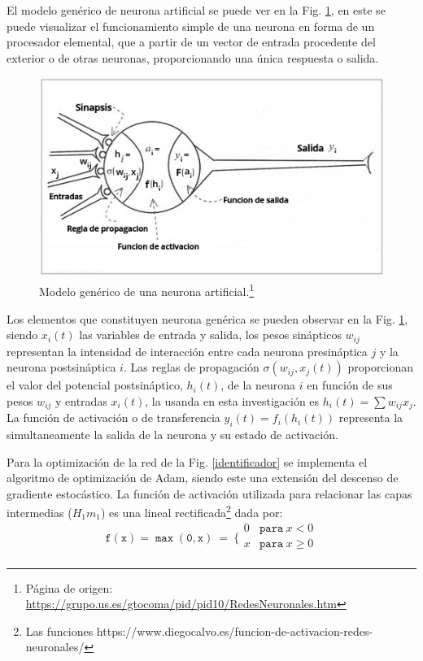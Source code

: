 El modelo genérico de neurona artificial se puede ver en la Fig. \ref{generico}, en este se puede visualizar el funcionamiento simple de una neurona en forma de un procesador elemental, que a partir de un vector de entrada procedente del exterior o de otras neuronas, proporcionando una única respuesta o salida.

\begin{figure}[!h]
\centering
\includegraphics[width=.7\textwidth]{Simulacion/imagenes/generico.png}
\caption[Modelo genérico de una neurona artificial.]{Modelo genérico de una neurona artificial.\footnote{Página de origen: \href{https://grupo.us.es/gtocoma/pid/pid10/RedesNeuronales.htm}{https://\-gru\-po.\-us.\-es/\-gto\-coma/\-pid/\-pid10/\-Re\-des\-Neu\-ro\-na\-les.\-htm}}}
\label{generico}
\end{figure}

Los elementos que constituyen neurona genérica se pueden observar en la Fig. \ref{generico}, siendo $x_i(t)$ las variables de entrada y salida, los pesos sinápticos $w_{ij}$ representan la intensidad de interacción entre cada neurona presináptica $j$ y la neurona postsináptica $i$. Las reglas de propagación $\sigma(w_{ij}, x_j(t))$ proporcionan el valor del potencial postsináptico, $h_i(t)$, de la neurona $i$ en función de sus pesos $w_{ij}$ y entradas $x_i(t)$, la usanda en esta investigación es $h_i (t) = \sum w_{ij} x_j$. La función de activación o de transferencia $y_i(t) = f_i(h_i(t))$ representa la simultaneamente la salida de la neurona y su estado de activación. 

Para la optimización de la red de la Fig. \ref{identificador} se implementa el algoritmo de optimización de Adam, siendo este una extensión del descenso de gradiente estocástico. La función de activación utilizada para relacionar las capas intermedias ($H_1m_1$) es una lineal rectificada\footnote{Las funciones https://www.diegocalvo.es/funcion-de-activacion-redes-neuronales/} dada por:
\begin{equation}
\mathtt{f(x)=\max (0,x)} ~ = ~ \Bigg\{\begin{matrix}
0 & \mathtt{para }~ x<0\\
x & \mathtt{para }~ x\geq 0\\
\end{matrix} 
\end{equation}

